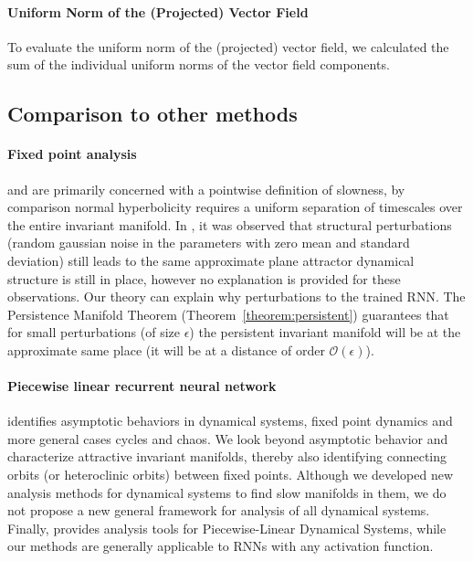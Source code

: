 \documentclass{article} %
\newcounter{ct}
\theoremstyle{definition}
\theoremstyle{remark}
\begin{document}
\paragraph{Uniform Norm of the (Projected) Vector Field}
To evaluate the uniform norm of the (projected) vector field, we calculated the sum of the individual uniform norms of the vector field components.


\newpage
\subsection{Comparison to other methods}

\paragraph{Fixed point analysis}

\citep{sussillo2013blackbox} and \citep{golub2018fixedpointfinder} are primarily concerned with a pointwise definition of slowness, by comparison normal hyperbolicity requires a uniform separation of timescales over the entire invariant manifold.
In \citep{sussillo2013blackbox}, it was observed that structural perturbations  (random gaussian noise in the parameters with zero mean and standard deviation) still leads to the same approximate plane attractor dynamical structure is still in place, however no explanation is provided for these observations.
Our theory can explain why perturbations to the trained RNN.
The Persistence Manifold Theorem (Theorem~\ref{theorem:persistent}) guarantees that for small perturbations (of size \(\epsilon\)) the persistent invariant manifold will be at the approximate same place (it will be at a distance of order \(\mathcal{O}(\epsilon)\)).





\paragraph{Piecewise linear recurrent neural network}
\citep{schmidt2019identifying} identifies asymptotic behaviors in dynamical systems, fixed point dynamics and more general cases cycles and chaos.
We look beyond asymptotic behavior and characterize attractive invariant manifolds, thereby also identifying connecting orbits (or heteroclinic orbits) between fixed points.
Although we developed new analysis methods for dynamical systems to find slow manifolds in them, we do not propose a new general framework for analysis of all dynamical systems.
Finally, \citep{schmidt2019identifying} provides analysis tools for Piecewise-Linear Dynamical Systems, while our methods are generally applicable to RNNs with any activation function.
\end{document}
